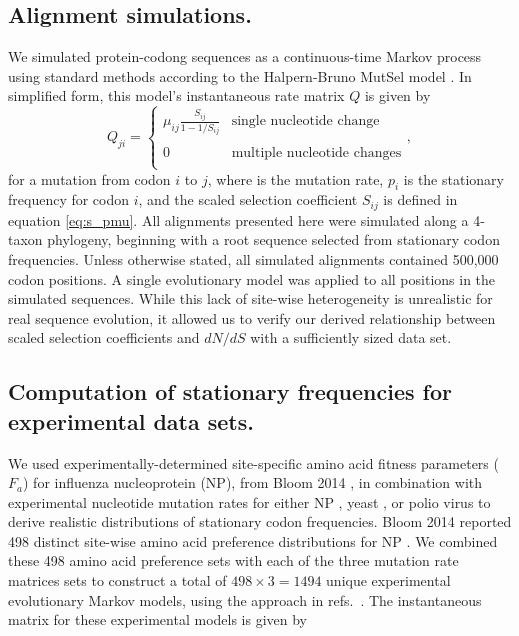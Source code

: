 \documentclass{pnastwo}
\begin{document}
\begin{article}
\subsection*{Alignment simulations.}
We simulated protein-codong sequences as a continuous-time Markov process using standard methods \cite{Yang2006} according to the Halpern-Bruno MutSel model \cite{HalpernBruno1998}. In simplified form, this model's instantaneous rate matrix $Q$ is given by
\begin{equation}\label{eq:HBmatrix}
Q_{ji} = \left\{ 
\begin{array}{rl}
\mu_{ij} \frac{S_{ij}}{1-1/S_{ij}} &\mbox{single nucleotide change} \\\\
0                                  &\mbox{multiple nucleotide changes} \\             
\end{array} \right.,
\end{equation} for a mutation from codon $i$ to $j$, where is the mutation rate, $p_i$ is the stationary frequency for codon $i$, and the scaled selection coefficient $S_{ij}$ is defined in equation \eqref{eq:s_pmu}. All alignments presented here were simulated along a 4-taxon phylogeny, beginning with a root sequence selected from stationary codon frequencies. Unless otherwise stated, all simulated alignments contained 500,000 codon positions. A single evolutionary model was applied to all positions in the simulated sequences. While this lack of site-wise heterogeneity is unrealistic for real sequence evolution, it allowed us to verify our derived relationship between scaled selection coefficients and $dN/dS$ with a sufficiently sized data set.

	
\subsection*{Computation of stationary frequencies for experimental data sets.}
We used experimentally-determined site-specific amino acid fitness parameters ($F_a$) for influenza nucleoprotein (NP), from Bloom 2014 \cite{Bloom2014a}, in combination with experimental nucleotide mutation rates for either NP \cite{Bloom2014a}, yeast \cite{Zhu2014}, or polio virus \cite{Acevedo2014} to derive realistic distributions of stationary codon frequencies. Bloom 2014 reported 498 distinct site-wise amino acid preference distributions for NP \cite{Bloom2014a}. We combined these 498 amino acid preference sets with each of the three mutation rate matrices sets to construct a total of $498 \times 3 = 1494$ unique experimental evolutionary Markov models, using the approach in refs.\ \cite{Bloom2014a,Bloom2014b}. The instantaneous matrix for these experimental models is given by 



\end{article}
\end{document}

